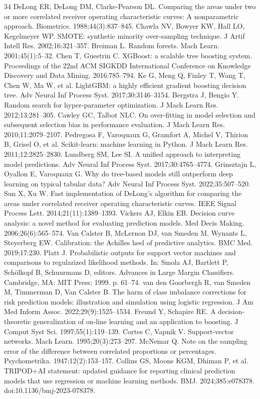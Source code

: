 \documentclass[a4paper,fleqn]{cas-dc}
\begin{document}
\begin{thebibliography}{34}
 DeLong ER, DeLong DM, Clarke-Pearson DL. Comparing the areas under two or more correlated receiver operating characteristic curves: A nonparametric approach. Biometrics. 1988;44(3):837--845.
 Chawla NV, Bowyer KW, Hall LO, Kegelmeyer WP. SMOTE: synthetic minority over-sampling technique. J Artif Intell Res. 2002;16:321--357.
 Breiman L. Random forests. Mach Learn. 2001;45(1):5--32.
 Chen T, Guestrin C. XGBoost: a scalable tree boosting system. Proceedings of the 22nd ACM SIGKDD International Conference on Knowledge Discovery and Data Mining. 2016:785--794.
 Ke G, Meng Q, Finley T, Wang T, Chen W, Ma W, et al. LightGBM: a highly efficient gradient boosting decision tree. Adv Neural Inf Process Syst. 2017;30:3146--3154.
 Bergstra J, Bengio Y. Random search for hyper-parameter optimization. J Mach Learn Res. 2012;13:281--305.
 Cawley GC, Talbot NLC. On over-fitting in model selection and subsequent selection bias in performance evaluation. J Mach Learn Res. 2010;11:2079--2107.
 Pedregosa F, Varoquaux G, Gramfort A, Michel V, Thirion B, Grisel O, et al. Scikit-learn: machine learning in Python. J Mach Learn Res. 2011;12:2825--2830.
 Lundberg SM, Lee SI. A unified approach to interpreting model predictions. Adv Neural Inf Process Syst. 2017;30:4765--4774.
 Grinsztajn L, Oyallon E, Varoquaux G. Why do tree-based models still outperform deep learning on typical tabular data? Adv Neural Inf Process Syst. 2022;35:507--520.
 Sun X, Xu W. Fast implementation of DeLong’s algorithm for comparing the areas under correlated receiver operating characteristic curves. IEEE Signal Process Lett. 2014;21(11):1389--1393.
 Vickers AJ, Elkin EB. Decision curve analysis: a novel method for evaluating prediction models. Med Decis Making. 2006;26(6):565--574.
 Van Calster B, McLernon DJ, van Smeden M, Wynants L, Steyerberg EW. Calibration: the Achilles heel of predictive analytics. BMC Med. 2019;17:230.
 Platt J. Probabilistic outputs for support vector machines and comparisons to regularized likelihood methods. In: Smola AJ, Bartlett P, Sch\"olkopf B, Schuurmans D, editors. Advances in Large Margin Classifiers. Cambridge, MA: MIT Press; 1999. p. 61--74.
 van den Goorbergh R, van Smeden M, Timmerman D, Van Calster B. The harm of class imbalance corrections for risk prediction models: illustration and simulation using logistic regression. J Am Med Inform Assoc. 2022;29(9):1525--1534.
 Freund Y, Schapire RE. A decision-theoretic generalization of on-line learning and an application to boosting. J Comput Syst Sci. 1997;55(1):119--139.
 Cortes C, Vapnik V. Support-vector networks. Mach Learn. 1995;20(3):273--297.
 McNemar Q. Note on the sampling error of the difference between correlated proportions or percentages. Psychometrika. 1947;12(2):153--157.
 Collins GS, Moons KGM, Dhiman P, et al. TRIPOD+AI statement: updated guidance for reporting clinical prediction models that use regression or machine learning methods. BMJ. 2024;385:e078378. doi:10.1136/bmj-2023-078378.
\end{thebibliography}
\end{document}
